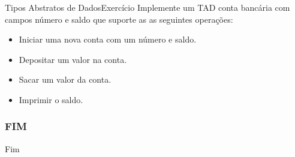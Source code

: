 \documentclass[aspectratio=169]{beamer}
\begin{document}

\begin{frame}{Tipos Abstratos de Dados}{Exercício}
Implemente um TAD conta bancária com campos número e saldo que suporte as as seguintes operações:
\begin{itemize}
\item Iniciar uma nova conta com um número e saldo.
\item Depositar um valor na conta.
\item Sacar um valor da conta.
\item Imprimir o saldo.
\end{itemize}
\end{frame}	


\begin{frame}
  \frametitle{FIM}
\huge{Fim}
\end{frame}	


\begin{frame}[plain]
  \titlepage
\end{frame}
\end{document}
